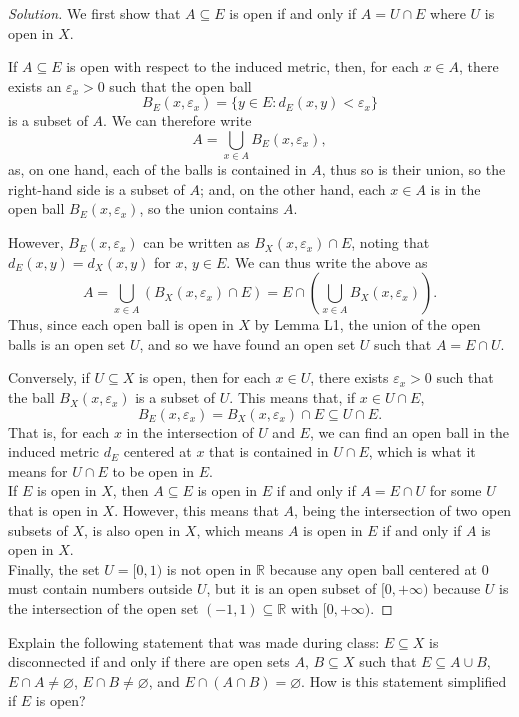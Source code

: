\documentclass[11pt]{scrartcl}
\providecommand{\eps}{\varepsilon}
\providecommand{\RR}{\mathbb R}
\newenvironment{soln}{\begin{proof}[Solution]}{\end{proof}}
\begin{document}
\begin{soln}
	We first show that $A\subseteq E$ is open if and only if $A = U\cap E$
	where $U$ is open in $X$.
	
	If $A\subseteq E$ is open with respect to the induced metric,
	then, for each $x\in A$, there exists an $\eps_x > 0$
	such that the open ball
	\[B_E(x, \eps_x) = \{y\in E : d_E(x, y) < \eps_x\}\]
	is a subset of $A$.
	We can therefore write
	\[A = \bigcup_{x\in A} B_E(x, \eps_x),\]
	as, on one hand, each of the balls is contained in $A$,
	thus so is their union, so the right-hand side is a subset of $A$;
	and, on the other hand, each $x\in A$ is in the open ball $B_E(x, \eps_x)$,
	so the union contains $A$.
	
	However, $B_E(x, \eps_x)$ can be written as $B_X(x, \eps_x) \cap E$,
	noting that $d_E(x, y) = d_X(x, y)$ for $x,\,y\in E$.
	We can thus write the above as
	\[A = \bigcup_{x\in A} (B_X(x, \eps_x)\cap E) =
	E\cap \left(\bigcup_{x\in A} B_X(x, \eps_x)\right).\]
	Thus, since each open ball is open in $X$ by Lemma L1,
	the union of the open balls is an open set $U$,
	and so we have found an open set $U$ such that $A = E\cap U$.
	
	Conversely, if $U\subseteq X$ is open, then for each $x\in U$,
	there exists $\eps_x > 0$ such that the ball $B_X(x, \eps_x)$
	is a subset of $U$. This means that, if $x\in U\cap E$,
	\[B_E(x, \eps_x) = B_X(x, \eps_x)\cap E
	 \subseteq U\cap E.\]
	That is, for each $x$ in the intersection of $U$ and $E$,
	we can find an open ball in the induced metric $d_E$
	centered at $x$ that is contained in $U\cap E$,
	which is what it means for $U\cap E$ to be open in $E$.\\
	
	If $E$ is open in $X$, then $A\subseteq E$ is open in $E$
	if and only if $A = E\cap U$ for some $U$ that is open in $X$.
	However, this means that $A$, being the intersection of
	two open subsets of $X$, is also open in $X$,
	which means $A$ is open in $E$ if and only if $A$ is open in $X$.\\
	
	Finally, the set $U = [0, 1)$ is not open in $\RR$ because
	any open ball centered at $0$ must contain numbers outside $U$,
	but it is an open subset of $[0, +\infty)$ because
	$U$ is the intersection of the open set $(-1, 1)\subseteq\RR$
	with $[0, +\infty)$.
\end{soln}

\begin{problem}
	Explain the following statement that was made during class:
	$E\subseteq X$ is disconnected if and only if
	there are open sets $A,\, B\subseteq X$ such that
	$E\subseteq A\cup B$, $E\cap A\ne\varnothing$, $E\cap B\ne\varnothing$,
	and $E\cap(A\cap B) = \varnothing$.
	How is this statement simplified if $E$ is open?
\end{problem}
\end{document}

